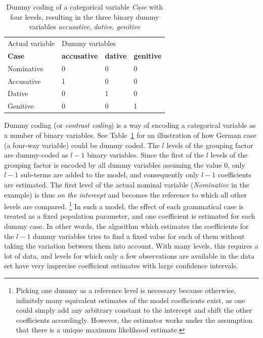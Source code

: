 \begin{table}
  \centering
  \begin{tabular}{llll}
    \toprule
    Actual variable & \multicolumn{3}{l}{Dummy variables} \\
    \textbf{Case}   & \textbf{accusative} & \textbf{dative} & \textbf{genitive} \\
    \midrule
    Nominative      & 0 & 0 & 0 \\ 
    Accusative      & 1 & 0 & 0 \\ 
    Dative          & 0 & 1 & 0 \\ 
    Genitive        & 0 & 0 & 1 \\ 
    \bottomrule
  \end{tabular}
  \caption{Dummy coding of a categorical variable \textit{Case} with four levels, resulting in the three binary dummy variables \textit{accusative}, \textit{dative}, \textit{genitive}}
  \label{tab:dummy}
\end{table}

Dummy coding (or \textit{contrast coding}) is a way of encoding a categorical variable as a number of binary variables.
See Table~\ref{tab:dummy} for an illustration of how German case (a four-way variable) could be dummy coded.
The $l$ levels of the grouping factor are dummy-coded as $l-1$ binary variables.
Since the first of the $l$ levels of the grouping factor is encoded by all dummy variables assuming the value 0, only $l-1$ sub-terms are added to the model, and consequently only $l-1$ coefficients are estimated.
The first level of the actual nominal variable (\textit{Nominative} in the example) is thus \textit{on the intercept} and becomes the reference to which all other levels are compared.%
\footnote{Picking one dummy as a reference level is necessary because otherwise, infinitely many equivalent estimates of the model coefficients exist, as one could simply add any arbitrary constant to the intercept and shift the other coefficients accordingly.
However, the estimator works under the assumption that there is a unique maximum likelihood estimate.}
In such a model, the effect of each grammatical case is treated as a fixed population parameter, and one coefficient is estimated for each dummy case.
In other words, the algorithm which estimates the coefficients for the $l-1$ dummy variables tries to find a fixed value for each of them without taking the variation between them into account.
With many levels, this requires a lot of data, and levels for which only a few observations are available in the data set have very imprecise coefficient estimates with large confidence intervals.


